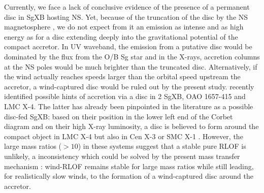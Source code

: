 \documentclass{aa}
\makeatletter
\newcommand{\sgx}{SgXB\xspace}
\newcommand*{\ns}{NS\@\xspace}
\makeatother
\begin{document}
Currently, we face a lack of conclusive evidence of the presence of a permanent disc in \sgx hosting \ns \citep{Bozzo2008,Shakura2012,Romano2015,Hu2017}. Yet, because of the truncation of the disc by the \ns magnetosphere \citep{Ghosh1978}, we do not expect from it an emission as intense and as high energy as for a disc extending deeply into the gravitational potential of the compact accretor. In UV waveband, the emission from a putative disc would be dominated by the flux from the O/B Sg star and in the X-rays, accretion columns at the \ns poles would be much brighter than the truncated disc. Alternatively, if the wind actually reaches speeds larger than the orbital speed upstream the accretor, a wind-captured disc would be ruled out by the present study. \cite{Taani2018} recently identified possible hints of accretion via a disc in 2 \sgx, OAO 1657-415 and LMC X-4. The latter has already been pinpointed in the literature as a possible disc-fed \sgx : based on their position in the lower left end of the Corbet diagram \citep{Corbet1984} and on their high X-ray luminosity, a disc is believed to form around the compact object in LMC X-4 but also in Cen X-3 or SMC X-1 \citep{Falanga2015}. However, the large mass ratios ($>10$) in these systems suggest that a stable pure RLOF is unlikely, a inconsistency which could be solved by the present mass transfer mechanism : wind-RLOF remains stable for large mass ratios while still leading, for realistically slow winds, to the formation of a wind-captured disc around the accretor.
\end{document}
